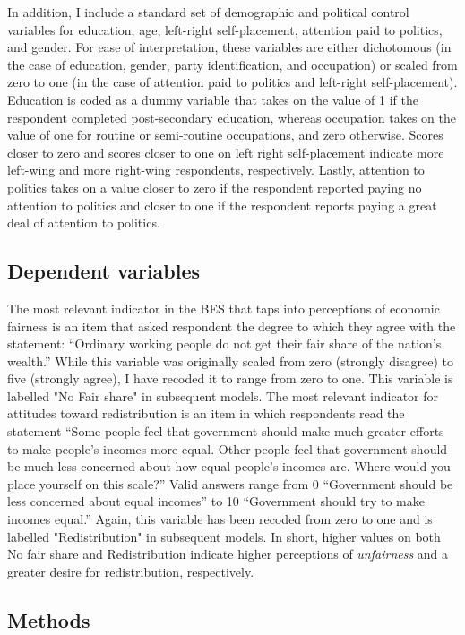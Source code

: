 \documentclass[12pt, letter]{scrartcl}
\begin{document}
In addition, I include a standard set of demographic and political control variables for education, age, left-right self-placement, attention paid to politics, and gender. For ease of interpretation, these variables are either dichotomous (in the case of education, gender, party identification, and occupation) or scaled from zero to one (in the case of attention paid to politics and left-right self-placement). Education is coded as a dummy variable that takes on the value of 1 if the respondent completed post-secondary education, whereas occupation takes on the value of one for routine or semi-routine occupations, and zero otherwise. Scores closer to zero and scores closer to one on left right self-placement indicate more left-wing and more right-wing respondents, respectively. Lastly, attention to politics takes on a value closer to zero if the respondent reported paying no attention to politics and closer to one if the respondent reports paying a great deal of attention to politics. 

\subsection{Dependent variables}

The most relevant indicator in the BES that taps into perceptions of economic fairness is an item that asked respondent the degree to which they agree with the statement: ``Ordinary working people do not get their fair share of the nation’s wealth.'' While this variable was originally scaled from zero (strongly disagree) to five (strongly agree), I have recoded it to range from zero to one. This variable is labelled "No Fair share" in subsequent models. The most relevant indicator for attitudes toward redistribution is an item in which respondents read the statement ``Some people feel that government should make much greater efforts to make people's incomes more equal. Other people feel that government should be much less concerned about how equal people’s incomes are. Where would you place yourself on this scale?'' Valid answers range from 0 ``Government should be less concerned about equal incomes'' to 10 ``Government should try to make incomes equal.'' Again, this variable has been recoded from zero to one and is labelled "Redistribution" in subsequent models. In short, higher values on both No fair share and Redistribution indicate higher perceptions of \textit{unfairness} and a greater desire for redistribution, respectively. 


\subsection{Methods}
\end{document}
